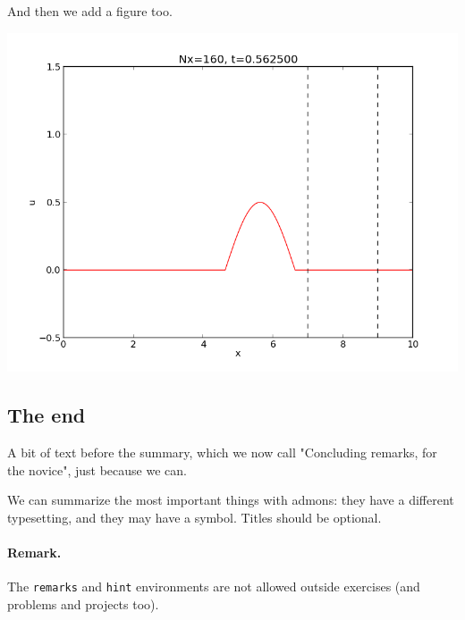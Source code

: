 \documentclass[%
oneside,                 %
final,                   %
10pt]{article}
\newenvironment{noticeshaded}
{\def\FrameCommand{\fboxsep=3mm\colorbox{colors1_notice_background}}
 \MakeFramed {\advance\hsize-\width \FrameRestore}}{\endMakeFramed}
\newenvironment{notice_colors1admon}[1][Notice]{
\begin{noticeshaded}
\noindent
\texttt{[image: latex\_figs/notice]}\ \ \   \textbf{#1}\\ \par
\vspace{-3mm}\nobreak\noindent\ignorespaces
}
{
\end{noticeshaded}
}
\newenvironment{summaryshaded}
{\def\FrameCommand{\fboxsep=3mm\colorbox{colors1_summary_background}}
 \MakeFramed {\advance\hsize-\width \FrameRestore}}{\endMakeFramed}
\newenvironment{summary_colors1admon}[1][Summary]{
\begin{summaryshaded}
\noindent
\texttt{[image: latex\_figs/summary]}\ \ \   \textbf{#1}\\ \par
\vspace{-3mm}\nobreak\noindent\ignorespaces
}
{
\end{summaryshaded}
}
\begin{document}
\begin{notice_colors1admon}
\begin{lstlisting}[language=Python,style=simple,xleftmargin=2mm]
\end{lstlisting}

And then we add a figure too.
\vspace{6mm}
\centerline{\includegraphics[width=0.7\linewidth]{testfigs/wave1D.png}}
\vspace{6mm}
\end{notice_colors1admon} %


\subsection{The end}
A bit of text before the summary, which we now call "Concluding remarks,
for the novice",
just because we can.

\begin{summary_colors1admon}
We can summarize the most important things with admons: they have
a different typesetting, and they may have a symbol.
Titles should be optional.
\end{summary_colors1admon} %


\paragraph{Remark.}
The \texttt{remarks} and \texttt{hint} environments are not allowed outside
exercises (and problems and projects too).
\end{document}
